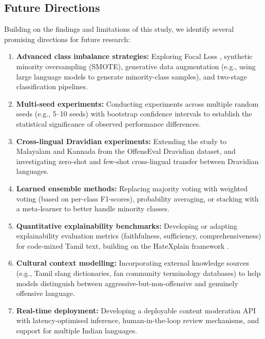\documentclass[12pt, a4paper]{article}
\begin{document}
\subsection{Future Directions}

Building on the findings and limitations of this study, we identify several promising directions for future research:

\begin{enumerate}[leftmargin=2em]
    \item \textbf{Advanced class imbalance strategies:} Exploring Focal Loss \citep{lin2017focal}, synthetic minority oversampling (SMOTE), generative data augmentation (e.g., using large language models to generate minority-class samples), and two-stage classification pipelines.
    
    \item \textbf{Multi-seed experiments:} Conducting experiments across multiple random seeds (e.g., 5--10 seeds) with bootstrap confidence intervals to establish the statistical significance of observed performance differences.
    
    \item \textbf{Cross-lingual Dravidian experiments:} Extending the study to Malayalam and Kannada from the OffensEval Dravidian dataset, and investigating zero-shot and few-shot cross-lingual transfer between Dravidian languages.
    
    \item \textbf{Learned ensemble methods:} Replacing majority voting with weighted voting (based on per-class F1-scores), probability averaging, or stacking with a meta-learner to better handle minority classes.
    
    \item \textbf{Quantitative explainability benchmarks:} Developing or adapting explainability evaluation metrics (faithfulness, sufficiency, comprehensiveness) for code-mixed Tamil text, building on the HateXplain framework \citep{mathew2021hatexplain}.
    
    \item \textbf{Cultural context modelling:} Incorporating external knowledge sources (e.g., Tamil slang dictionaries, fan community terminology databases) to help models distinguish between aggressive-but-non-offensive and genuinely offensive language.
    
    \item \textbf{Real-time deployment:} Developing a deployable content moderation API with latency-optimised inference, human-in-the-loop review mechanisms, and support for multiple Indian languages.
\end{enumerate}
\end{document}
